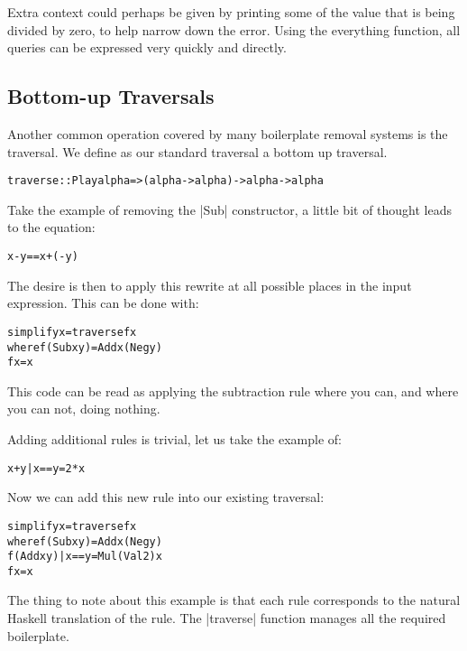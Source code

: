 \documentclass[preprint]{sigplanconf}
\newcommand{\C}[1]{\textsf{#1}}
\newenvironment{code}{\begin{alltt}\small}{\end{alltt}}
\begin{document}
Extra context could perhaps be given by printing some of the value that is being divided by zero, to help narrow down the error. Using the \C{everything} function, all queries can be expressed very quickly and directly.

\subsection{Bottom-up Traversals}

Another common operation covered by many boilerplate removal systems is the traversal.
We define as our standard traversal a bottom up traversal.

\begin{code}
traverse :: Play alpha => (alpha -> alpha) -> alpha -> alpha
\end{code}

Take the example of removing the |Sub| constructor, a little bit of thought leads to the equation:

\begin{code}
x - y == x + (- y)
\end{code}

The desire is then to apply this rewrite at all possible places in the input expression. This can be done with:

\begin{code}
simplify x = traverse f x
    where  f (Sub x y)  = Add x (Neg y)
           f x          = x
\end{code}

This code can be read as applying the subtraction rule where you can, and where you can not, doing nothing.

Adding additional rules is trivial, let us take the example of:

\begin{code}
x + y | x == y = 2 * x
\end{code}

Now we can add this new rule into our existing traversal:

\begin{code}
simplify x = traverse f x
    where  f (Sub x y)           = Add x (Neg y)
           f (Add x y) | x == y  = Mul (Val 2) x
           f x                   = x
\end{code}

The thing to note about this example is that each rule corresponds to the natural Haskell translation of the rule. The |traverse| function manages all the required boilerplate.
\end{document}
